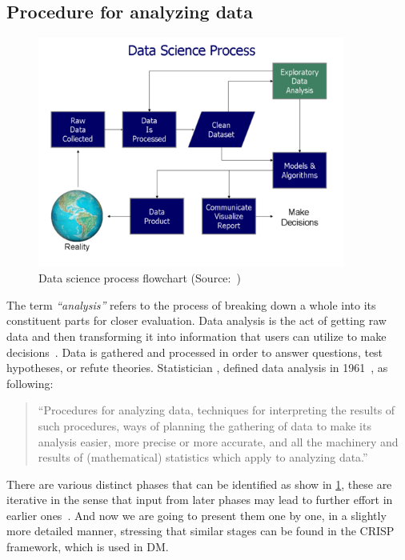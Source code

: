 \subsection{Procedure for analyzing data}
\begin{figure}[t]
    \centering
    \includegraphics[width=0.9\textwidth]{content/chapter_1/images/Data_visualization_process_v1.png}
    \caption{Data science process flowchart (Source:~\cite{Book:doing_data_science})}
    \label{fig:data-science-flowchart}
\end{figure}
The term \textit{``analysis''} refers to the process of breaking down a whole into its constituent parts for closer evaluation.
Data analysis is the act of getting raw data and then transforming it into information that users can utilize to make decisions~\cite{Book:sbrown_2014_transforming}.
Data is gathered and processed in order to answer questions, test hypotheses, or refute theories.
Statistician \citeauthor{Article:future_of_data_tukey}, defined data analysis in 1961~\cite{Article:future_of_data_tukey}, as following:
\begin{quote}
    ``Procedures for analyzing data, techniques for interpreting the results of such procedures, ways of planning the gathering of data to make its analysis easier, 
    more precise or more accurate, and all the machinery and results of (mathematical) statistics which apply to analyzing data.''
\end{quote}
There are various distinct phases that can be identified as show in \ref{fig:data-science-flowchart}, these are iterative in the sense that input from later phases may lead to further effort in earlier ones~\cite{Book:doing_data_science}.
And now we are going to present them one by one, in a slightly more detailed manner, stressing that similar stages can be found in the \ac{CRISP} framework, which is used in \acl{DM}.

